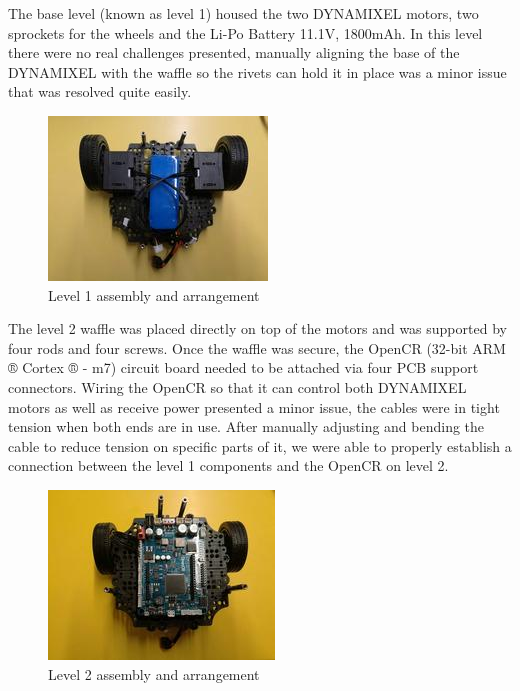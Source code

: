 \documentclass[12pt]{report}
\begin{document}
The base level (known as level 1) housed the two DYNAMIXEL motors, two sprockets for the wheels and the Li-Po Battery 11.1V, 1800mAh. In this level there were no real challenges presented, manually aligning the base of the DYNAMIXEL with the waffle so the rivets can hold it in place was a minor issue that was resolved quite easily.\par
    \begin{figure}[H]
        \centering
        \includegraphics{Fig3.jpg}
        \caption{Level 1 assembly and arrangement}
        \label{fig:3}
    \end{figure}
\vspace{1em}
The level 2 waffle was placed directly on top of the motors and was supported by four rods and four screws. Once the waffle was secure, the OpenCR (32-bit ARM ® Cortex ® - m7) circuit board needed to be attached via four PCB support connectors. Wiring the OpenCR so that it can control both DYNAMIXEL motors as well as receive power presented a minor issue, the cables were in tight tension when both ends are in use. After manually adjusting and bending the cable to reduce tension on specific parts of it, we were able to properly establish a connection between the level 1 components and the OpenCR on level 2.\par
\begin{figure}[H]
        \centering
        \includegraphics{Fig4.jpg}
        \caption{Level 2 assembly and arrangement}
        \label{fig:4}
    \end{figure}
\vspace{1em}
\end{document}
